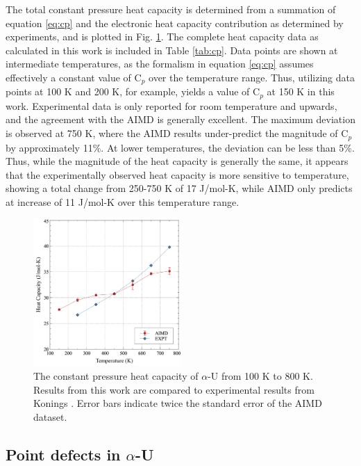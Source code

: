 \documentclass[utf8]{frontiersSCNS} %
\begin{document}
The total constant pressure heat capacity is determined from a summation of equation \ref{eq:cp} and the electronic heat capacity contribution as determined by experiments, and is plotted in Fig. \ref{fig:cp}. The complete heat capacity data as calculated in this work is included in Table \ref{tab:cp}. Data points are shown at intermediate temperatures, as the formalism in equation \ref{eq:cp} assumes effectively a constant value of C$_p$ over the temperature range. Thus, utilizing data points at 100 K and 200 K, for example, yields a value of C$_p$ at 150 K in this work. Experimental data is only reported for room temperature and upwards, and the agreement with the AIMD is generally excellent. The maximum deviation is observed at 750 K, where the AIMD results under-predict the magnitude of C$_p$ by approximately 11\%. At lower temperatures, the deviation can be less than 5\%. Thus, while the magnitude of the heat capacity is generally the same, it appears that the experimentally observed heat capacity is more sensitive to temperature, showing a total change from 250-750 K of 17 J/mol-K, while AIMD only predicts at increase of 11 J/mol-K over this temperature range. 

 \begin{figure}[hbt]
	\centering
	\includegraphics[width=0.5\textwidth]{cp.jpg}
    \caption{The constant pressure heat capacity of $\alpha$-U from 100 K to 800 K. Results from this work are compared to experimental results from Konings \cite{konings2010}. Error bars indicate twice the standard error of the AIMD dataset.}\label{fig:cp}
\end{figure}

\FloatBarrier

\subsection{Point defects in $\alpha$-U}
\end{document}
